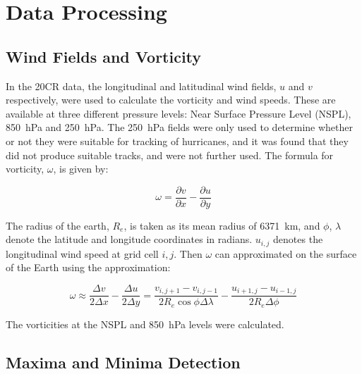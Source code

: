 \documentclass[pdftex,12pt,a4paper]{report}
\begin{document}
\section{Data Processing}

\subsection{Wind Fields and Vorticity}
\label{sec:vort}

In the 20CR data, the longitudinal and latitudinal wind fields, $u$ and $v$ respectively, were used
to calculate the vorticity and wind speeds. These are available at three different pressure levels:
Near Surface Pressure Level (NSPL), \SI{850}{hPa} and \SI{250}{hPa}. The \SI{250}{hPa} fields were
only used to determine whether or not they were suitable for tracking of hurricanes, and it was
found that they did not produce suitable tracks, and were not further used. The formula for
vorticity, $\omega$, is given by:

\begin{equation}
    \omega = \frac{\partial v}{\partial x} - \frac{\partial u}{\partial y}
    \label{eqn:vorticity}
\end{equation}

The radius of the earth, $R_e$, is taken as its mean radius of \SI{6371}{km}, and $\phi$, $\lambda$
denote the latitude and longitude coordinates in radians. $u_{i, j}$ denotes the longitudinal wind
speed at grid cell $i, j$. Then $\omega$ can approximated on the surface of the Earth using the
approximation: 


\begin{equation}
    \omega \approx \frac{\Delta v}{2 \Delta x} - \frac{\Delta u}{2 \Delta y} = \frac{v_{i,j+1} - v_{i,j-1}}{2 R_e \cos{\phi} \Delta \lambda} - \frac{u_{i+1,j} - u_{i-1,j}}{2 R_e \Delta \phi }
    \label{eqn:vorticity_2nd_order}
\end{equation}

The vorticities at the NSPL and \SI{850}{hPa} levels were calculated.

\subsection{Maxima and Minima Detection}
\label{sec:methods_maxima_minima}
\end{document}

